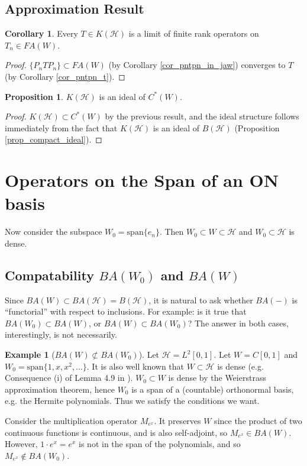\documentclass{dcthesis}
\numberwithin{equation}{section}
\numberwithin{equation}{section}
\theoremstyle{definition}
\newtheorem{proposition}[equation]{Proposition}
\newtheorem{corollary}[equation]{Corollary}
\newtheorem{example}[equation]{Example}
\begin{document}

\subsection{Approximation Result} %

\begin{corollary}
	Every $T\in K(\mathcal{H})$ is a limit of finite rank operators on $T_n\in FA(W)$.
\end{corollary}
\begin{proof}
	$\{P_nTP_n \}\subset FA(W)$ (by Corollary \ref{cor_pntpn_in_jaw}) converges to $T$ (by Corollary \ref{cor_pntpn_t}).
\end{proof}

\begin{proposition}
	$K(\mathcal{H})$ is an ideal of $C^\ast(W)$. 
\end{proposition}
\begin{proof}
	$K(\mathcal{H})\subset C^\ast(W)$ by the previous result, and the ideal structure follows immediately from the fact that $K(\mathcal{H})$ is an ideal of $B(\mathcal{H})$ (Proposition \ref{prop_compact_ideal}). 
\end{proof}



\section{Operators on the Span of an ON basis} %

Now consider the subspace $W_0=\text{span}\{e_n\}$. Then $W_0\subset W\subset\mathcal{H}$ and $W_0\subset\mathcal{H}$ is dense.

\subsection{Compatability $BA(W_0)$ and $BA(W)$} %

Since $BA(W)\subset BA(\mathcal{H})=B(\mathcal{H})$, it is natural to ask whether $BA(-)$ is ``functorial'' with respect to inclusions. For example: is it true that $BA(W_0)\subset BA(W)$, or $BA(W)\subset BA(W_0)$? The answer in both cases, interestingly, is not necessarily.

\begin{example}[$BA(W)\not\subset BA(W_0)$]
	Let $\mathcal{H}=L^2[0,1]$. Let $W=C[0,1]$ and $W_0=\text{span}\{1, x, x^2, \dots\}$. It is also well known that $W\subset\mathcal{H}$ is dense (e.g. Consequence (i) of Lemma 4.9 in \cite{legall_2022}). $W_0\subset W$ is dense by the Weierstrass approximation theorem, hence $W_0$ is a span of a (countable) orthonormal basis, e.g. the Hermite polynomials. Thus we satisfy the conditions we want.

	Consider the multiplication operator $M_{e^x}$. It preserves $W$ since the product of two continuous functions is continuous, and is also self-adjoint, so $M_{e^x}\in BA(W)$. However, $1\cdot e^x = e^x$ is not in the span of the polynomials, and so $M_{e^x}\not\in BA(W_0)$.
\end{example}
\end{document}
